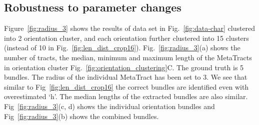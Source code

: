 \subsection{Robustness to parameter changes}
Figure~\ref{fig:radius_3} shows the results of data set in Fig.~\ref{fig:data-char} clustered into 2 orientation cluster, and each orientation further clustered into 15 clusters (instead of 10 in Fig.~\ref{fig:len_dist_crop16}). Fig.~\ref{fig:radius_3}(a) shows the number of tracts, the median, minimum and maximum length of the MetaTracts in orientation cluster Fig.~\ref{fig:orientation_clustering}C.
The ground truth is 5 bundles. The radius of the individual MetaTract has been set to 3. We see that similar to Fig~\ref{fig:len_dist_crop16} the correct bundles are identified even with overestimated `h'. The median lengths of the extracted bundles are also similar. Fig~\ref{fig:radius_3}(c, d) shows the individual orientation bundles and Fig~\ref{fig:radius_3}(b) shows the combined bundles.
